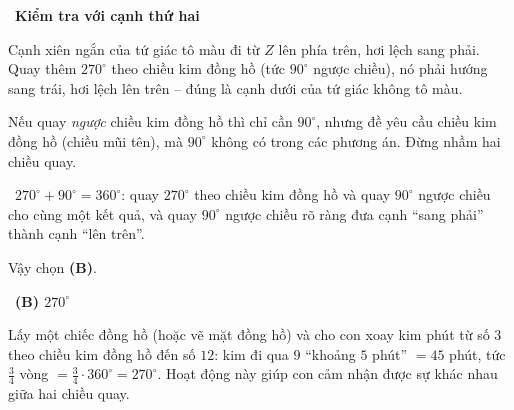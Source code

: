 \documentclass[11pt]{article}
\providecommand{\AnsWord}{Đáp số}
\newcommand{\ans}[1]{\par\smallskip{\bfseries\color{tmGreen!88!black}\AnsWord:}\ {\bfseries\color{AnsRed}#1}\par}
\newcommand{\step}[2]{\par\smallskip\noindent{\bfseries\color{tmBlue!85!black}\StepWord~#1.}\ {\bfseries #2}\par\nopagebreak}
\newcommand{\verify}[1]{\par\smallskip\noindent{\bfseries\color{tmGreen!80!black}\faCheckCircle\ \CheckWord}\ #1\par}
\def\AnsWord{Đáp số}
\def\StepWord{Bước}
\def\CheckWord{Thử lại:}
\begin{document}
{\step{3}{Kiểm tra với cạnh thứ hai}
Cạnh xiên ngắn của tứ giác tô màu đi từ $Z$ lên phía trên, hơi lệch sang phải. Quay thêm $270^\circ$ theo chiều kim đồng hồ (tức $90^\circ$ ngược chiều), nó phải hướng sang trái, hơi lệch lên trên -- đúng là cạnh dưới của tứ giác không tô màu.
\begin{warnbox}Nếu quay \emph{ngược} chiều kim đồng hồ thì chỉ cần $90^\circ$, nhưng đề yêu cầu chiều kim đồng hồ (chiều mũi tên), mà $90^\circ$ không có trong các phương án. Đừng nhầm hai chiều quay.\end{warnbox}
\verify{$270^\circ+90^\circ=360^\circ$: quay $270^\circ$ theo chiều kim đồng hồ và quay $90^\circ$ ngược chiều cho cùng một kết quả, và quay $90^\circ$ ngược chiều rõ ràng đưa cạnh ``sang phải'' thành cạnh ``lên trên''.}
Vậy chọn \textbf{(B)}.
\ans{(B) $270^\circ$}
\begin{parentbox}Lấy một chiếc đồng hồ (hoặc vẽ mặt đồng hồ) và cho con xoay kim phút từ số $3$ theo chiều kim đồng hồ đến số $12$: kim đi qua $9$ ``khoảng $5$ phút'' $=45$ phút, tức $\frac34$ vòng $=\frac34\cdot360^\circ=270^\circ$. Hoạt động này giúp con cảm nhận được sự khác nhau giữa hai chiều quay.\end{parentbox}
}
\end{document}
